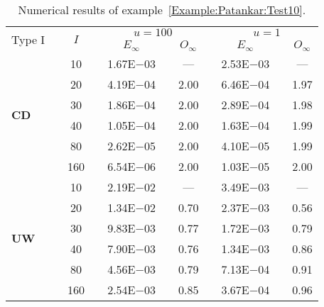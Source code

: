 {\renewcommand{\baselinestretch}{1.0}
\begin{table}[H]
\caption{Numerical results of example~\ref{Example:Patankar:Test10}.}

\setlength{\tabcolsep}{5pt}
\centering
\begin{tabular}{@{}l c c c c c c c c c c@{}}
\toprule
\multicolumn{1}{c}{\multirow{2}{*}{Type I}} & \multicolumn{1}{c}{} & \multicolumn{1}{c}{\multirow{2}{*}{$I$}} & \multicolumn{1}{c}{} & \multicolumn{3}{c}{$u=100$} &  & \multicolumn{3}{c}{$u=1$} \\
\cline{5-7}
\cline{9-11} 
\multicolumn{1}{c}{} & \multicolumn{1}{c}{} & \multicolumn{1}{c}{} & \multicolumn{1}{c}{} & \multicolumn{1}{c}{$E_{\infty}$} & \multicolumn{1}{c}{} & \multicolumn{1}{c}{$O_{\infty}$} &  & \multicolumn{1}{c}{$E_{\infty}$} &  & \multicolumn{1}{c}{$O_{\infty}$}\\
\midrule
\multirow{6}{*}{\textbf{CD}}
&  & 10 &  & 1.67E$-$03 &  & --- &  & 2.53E$-$03 &  & ---\\
&  & 20 &  & 4.19E$-$04 &  & 2.00 &  & 6.46E$-$04 &  & 1.97\\
&  & 30 &  & 1.86E$-$04 &  & 2.00 &  & 2.89E$-$04 &  & 1.98\\
&  & 40 &  & 1.05E$-$04 &  & 2.00 &  & 1.63E$-$04 &  & 1.99\\
&  & 80 &  & 2.62E$-$05 &  & 2.00 &  & 4.10E$-$05 &  & 1.99\\
&  & 160 &  & 6.54E$-$06 &  & 2.00 &  & 1.03E$-$05 &  & 2.00\\
\midrule
\multirow{6}{*}{\textbf{UW}}
&  & 10 &  & 2.19E$-$02 &  & --- &  & 3.49E$-$03 &  & ---\\
&  & 20 &  & 1.34E$-$02 &  & 0.70 &  & 2.37E$-$03 &  & 0.56\\
&  & 30 &  & 9.83E$-$03 &  & 0.77 &  & 1.72E$-$03 &  & 0.79\\
&  & 40 &  & 7.90E$-$03 &  & 0.76 &  & 1.34E$-$03 &  & 0.86\\
&  & 80 &  & 4.56E$-$03 &  & 0.79 &  & 7.13E$-$04 &  & 0.91\\
&  & 160 &  & 2.54E$-$03 &  & 0.85 &  & 3.67E$-$04 &  & 0.96\\
\bottomrule
\end{tabular}
\label{Table:Patankar:Test10}
\end{table}}
